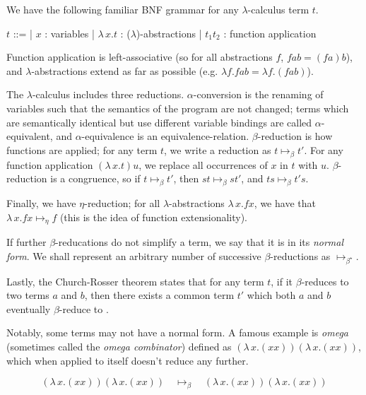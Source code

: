 \documentclass[logo,bsc,singlespacing,parskip,online]{infthesis}
\begin{document}
We have the following familiar BNF grammar for any $\lambda$-calculus term $t$.

\begin{center}
\begin{bnf}
  $t$ ::=
  | $x$ : variables
  | $\lambda \, x. t$ : ($\lambda$)-abstractions
  | $t_1 t_2$ : function application
\end{bnf}
\end{center}

Function application is left-associative (so for all abstractions $f$, $f a b =
(f a) b$), and $\lambda$-abstractions extend as far as possible (e.g. $\lambda
f. f a b = \lambda f. (f a b)$).

The $\lambda$-calculus includes three reductions. $\alpha$-conversion is the
renaming of variables such that the semantics of the program are not changed;
terms which are semantically identical but use different variable bindings are
called $\alpha$-equivalent, and $\alpha$-equivalence is an equivalence-relation.
$\beta$-reduction is how functions are applied; for any term $t$, we write a
reduction as $t \mapsto_{\beta} t'$. For any function application $(\lambda \,
x. t) u$, we replace all occurrences of $x$ in $t$ with $u$. $\beta$-reduction
is a congruence, so if $t \mapsto_{\beta} t'$, then $st \mapsto_{\beta} st'$,
and $ts \mapsto_{\beta} t's$.

Finally, we have $\eta$-reduction; for all $\lambda$-abstractions $\lambda \, x.
f x$, we have that $\lambda \, x. f x \mapsto_{\eta} f$ (this is the idea of
function extensionality).

If further $\beta$-reducations do not simplify a term, we say that it is in its
\textit{normal form}. We shall represent an arbitrary number of successive
$\beta$-reductions as $\mapsto_{\beta^{\star}}$.

Lastly, the Church-Rosser theorem states that for any term $t$, if it
$\beta$-reduces to two terms $a$ and $b$, then there exists a common term $t'$
which both $a$ and $b$ eventually $\beta$-reduce to
\citep{church_properties_1936}.

Notably, some terms may not have a normal form. A famous example is
\textit{omega} (sometimes called the \textit{omega combinator}) defined as
$(\lambda \, x. (x x)) (\lambda \, x. (x x))$, which when applied to itself
doesn't reduce any further.

\begin{equation*}
  (\lambda \, x. (x x)) (\lambda \, x. (x x)) \quad \mapsto_{\beta} \quad (\lambda \, x. (x x)) (\lambda \, x. (x x))
\end{equation*}
\end{document}
